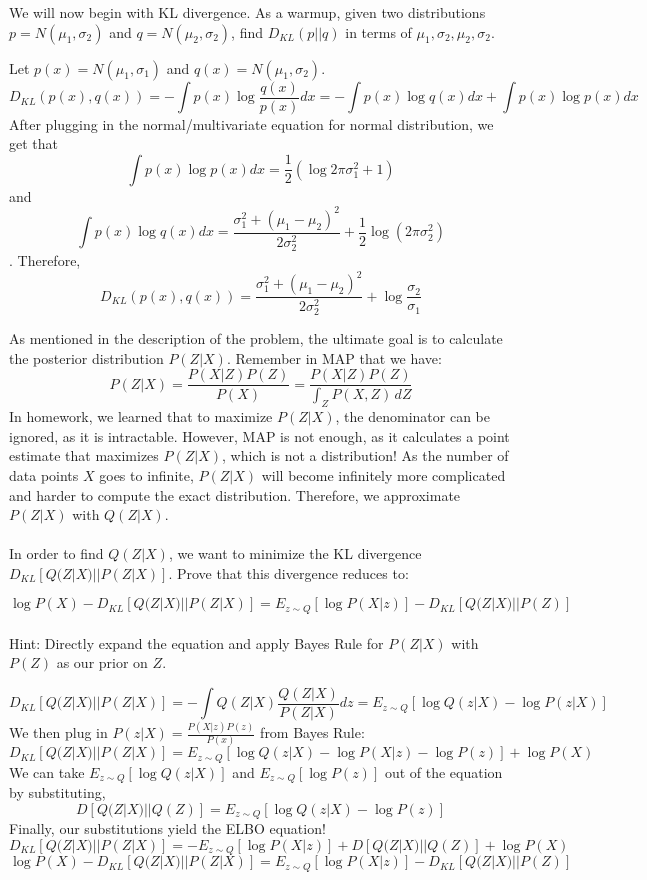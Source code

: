 \begin{Parts}

\Part
We will now begin with KL divergence. As a warmup, given two distributions $ p = N(\mu_1, \sigma_2)$ and $ q = N(\mu_2, \sigma_2) $, find $ D_{KL}(p||q) $ in terms of $ \mu_1, \sigma_2, \mu_2, \sigma_2 $.

\begin{solution}

Let $ p(x) = N(\mu_1, \sigma_1) $ and $ q(x) = N(\mu_1, \sigma_2)$. \[ D_{KL}(p(x), q(x)) = - \int p(x)\log\frac{q(x)}{p(x)}dx = - \int p(x) \log q(x) dx + \int p(x) \log p(x) dx \] After plugging in the normal/multivariate equation for normal distribution, we get that \[ \int p(x) \log p(x) dx = \frac{1}{2} (\log 2 \pi \sigma_1^2+1) \]
and \[ \int p(x) \log q(x) dx = \frac{\sigma_1^2 + (\mu_1 - \mu_2)^2}{2 \sigma_2^2} + \frac{1}{2} \log (2 \pi \sigma_2^2) \].
Therefore, \[ D_{KL}(p(x), q(x)) =  \frac{\sigma_1^2 + (\mu_1 - \mu_2)^2}{2 \sigma_2^2} + \log \frac{\sigma_2}{\sigma_1} \]

\end{solution}


\Part
As mentioned in the description of the problem, the ultimate goal is to calculate the posterior distribution $ P(Z|X) $. Remember in MAP that we have: \[  P(Z|X) = \frac{P(X|Z)P(Z)}{P(X)} = \frac{P(X|Z)P(Z)}{\int_{Z} P(X,Z) \,dZ}  \]
In homework, we learned that to maximize $ P(Z|X) $, the denominator can be ignored, as it is intractable. However, MAP is not enough, as it calculates a point estimate that maximizes $ P(Z|X) $, which is not a distribution!
As the number of data points $ X $ goes to infinite, $ P(Z|X) $ will become infinitely more complicated and harder to compute the exact distribution. Therefore, we approximate $ P(Z|X) $ with $ Q(Z|X)$. \\\\ In order to find $ Q(Z|X) $, we want to minimize the KL divergence $ D_{KL}[Q(Z|X)||P(Z|X)] $. Prove that this divergence reduces to:

\[ \log P(X) -D_{KL}[Q(Z|X)||P(Z|X)] = E_{z\sim Q}[\log P(X|z)] - D_{KL}[Q(Z|X)||P(Z)] \]
\\Hint: Directly expand the equation and apply Bayes Rule for $ P(Z|X) $ with $ P(Z) $ as our prior on $ Z $.

\begin{solution}

\[  D_{KL}[Q(Z|X)||P(Z|X)] = - \int Q(Z|X)\frac{Q(Z|X)}{P(Z|X)}dz = E_{z\sim Q}[\log Q(z|X)-\log P(z|X)] \]
We then plug in $ P(z|X) = \frac{P(X|z)P(z)}{P(x)}$ from Bayes Rule:
\[  D_{KL}[Q(Z|X)||P(Z|X)] = E_{z\sim Q}[\log Q(z|X) - \log P(X|z) - \log P(z)] + \log P(X)  \] We can take  $ E_{z\sim Q}[\log Q(z|X)] $ and   $ E_{z\sim Q}[\log P(z)] $ out of the equation by substituting,   \[ D[Q(Z|X)||Q(Z)] =E_{z\sim Q}[\log Q(z|X)-\log P(z)] \]
Finally, our substitutions yield the ELBO equation!
\[  D_{KL}[Q(Z|X)||P(Z|X)] = -E_{z\sim Q}[\log P(X|z)] + D[Q(Z|X)||Q(Z)] + \log P(X)  \]
\[ \log P(X) -D_{KL}[Q(Z|X)||P(Z|X)] = E_{z\sim Q}[\log P(X|z)] - D_{KL}[Q(Z|X)||P(Z)] \]



\end{solution}
\end{Parts}

